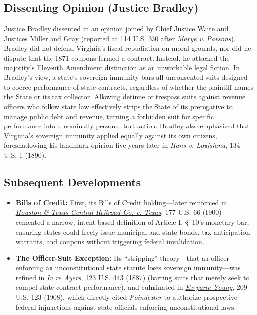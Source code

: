 \documentclass[12pt]{article}
\begin{document}
\subsection{Dissenting Opinion (Justice Bradley)}

Justice Bradley dissented in an opinion joined by Chief Justice Waite and Justices Miller and Gray (reported at \href{https://supreme.justia.com/cases/federal/us/114/325/}{114 U.S. 330} after \textit{Marye v. Parsons}). Bradley did not defend Virginia's fiscal repudiation on moral grounds, nor did he dispute that the 1871 coupons formed a contract. Instead, he attacked the majority's Eleventh Amendment distinction as an unworkable legal fiction. In Bradley's view, a state's sovereign immunity bars all unconsented suits designed to coerce performance of state contracts, regardless of whether the plaintiff names the State or its tax collector. Allowing detinue or trespass suits against revenue officers who follow state law effectively strips the State of its prerogative to manage public debt and revenue, turning a forbidden suit for specific performance into a nominally personal tort action. Bradley also emphasized that Virginia's sovereign immunity applied equally against its own citizens, foreshadowing his landmark opinion five years later in \textit{Hans v. Louisiana}, 134 U.S. 1 (1890).

\subsection{Subsequent Developments}

\begin{itemize}

\item \textbf{Bills of Credit:} First, its Bills of Credit holding---later reinforced in \href{https://www.law.cornell.edu/supremecourt/text/177/66}{\textit{Houston \& Texas Central Railroad Co. v. Texas}}, 177 U.S. 66 (1900)---cemented a narrow, intent-based definition of Article I, \S~10's monetary bar, ensuring states could freely issue municipal and state bonds, tax-anticipation warrants, and coupons without triggering federal invalidation.

\item \textbf{The Officer-Suit Exception:} Its ``stripping'' theory---that an officer enforcing an unconstitutional state statute loses sovereign immunity---was refined in \href{https://www.law.cornell.edu/supremecourt/text/123/443}{\textit{In re Ayers}}, 123 U.S. 443 (1887) (barring suits that merely seek to compel state contract performance), and culminated in \href{https://supreme.justia.com/cases/federal/us/209/123/}{\textit{Ex parte Young}}, 209 U.S. 123 (1908), which directly cited \textit{Poindexter} to authorize prospective federal injunctions against state officials enforcing unconstitutional laws.

\end{itemize}
\end{document}

